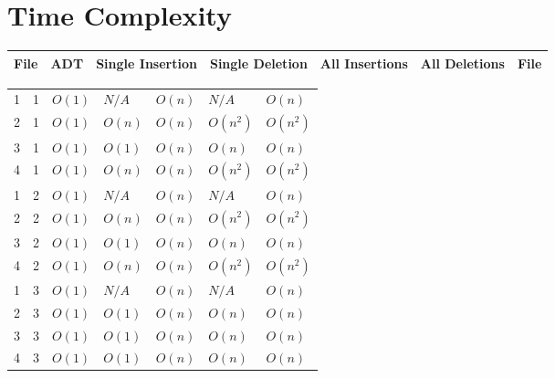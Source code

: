 \documentclass[12pt]{article}
\begin{document}
\pagebreak

\section{Time Complexity}

\begin{center}
    \begin{tabularx}{\linewidth}{X X X X X X X}
        File & ADT & \mbox{Single} \mbox{Insertion} & \mbox{Single} \mbox{Deletion} & \mbox{All} \mbox{Insertions} & \mbox{All} \mbox{Deletions} & File \\
        \hline
    \end{tabularx}

    \begin{tabularx}{\linewidth}{X X X X X X X}

        1 & 1 & $O(1)$      & $N/A$       & $O(n)$       & $N/A$        & $O(n)$       \\
        2 & 1 & $O(1)$      & $O(n)$      & $O(n)$       & $O(n^2)$     & $O(n^2)$     \\
        3 & 1 & $O(1)$      & $O(1)$      & $O(n)$       & $O(n)$       & $O(n)$       \\
        4 & 1 & $O(1)$      & $O(n)$      & $O(n)$       & $O(n^2)$     & $O(n^2)$     \\
        \hline

        1 & 2 & $O(1)$      & $N/A$       & $O(n)$       & $N/A$        & $O(n)$       \\
        2 & 2 & $O(1)$      & $O(n)$      & $O(n)$       & $O(n^2)$     & $O(n^2)$     \\
        3 & 2 & $O(1)$      & $O(1)$      & $O(n)$       & $O(n)$       & $O(n)$       \\
        4 & 2 & $O(1)$      & $O(n)$      & $O(n)$       & $O(n^2)$     & $O(n^2)$     \\
        \hline

        1 & 3 & $O(1)$      & $N/A$       & $O(n)$       & $N/A$        & $O(n)$       \\
        2 & 3 & $O(1)$      & $O(1)$      & $O(n)$       & $O(n)$       & $O(n)$       \\
        3 & 3 & $O(1)$      & $O(1)$      & $O(n)$       & $O(n)$       & $O(n)$       \\
        4 & 3 & $O(1)$      & $O(1)$      & $O(n)$       & $O(n)$       & $O(n)$       \\
        \hline


\end{tabularx}
\end{center}
\end{document}
